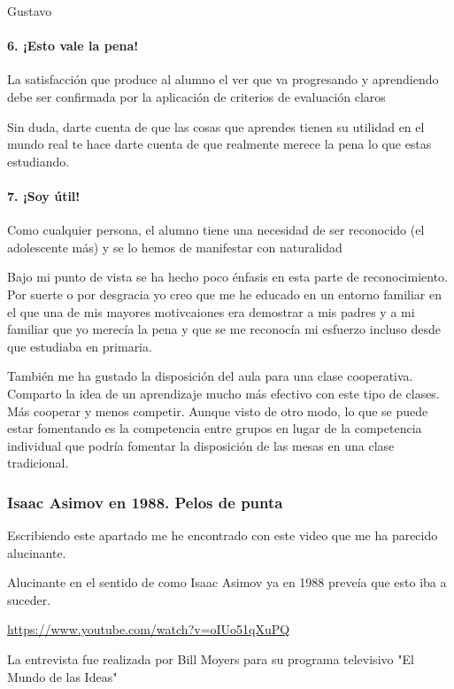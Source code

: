 \begin{opin}{\guscolor}{Gustavo}
\paragraph{6. ¡Esto vale la pena!}

La satisfacción que produce al alumno el ver que va progresando y aprendiendo debe ser confirmada por la aplicación de criterios de evaluación claros

Sin duda, darte cuenta de que las cosas que aprendes tienen su utilidad en el mundo real te hace darte cuenta de que realmente merece la pena lo que estas estudiando.

\paragraph{7. ¡Soy útil!}

Como cualquier persona, el alumno tiene una necesidad de ser reconocido (el adolescente más) y se lo hemos de manifestar con naturalidad

Bajo mi punto de vista se ha hecho poco énfasis en esta parte de reconocimiento. Por suerte o por desgracia yo creo que me he educado en un entorno familiar en el que una de mis mayores motivcaiones era demostrar a mis padres y a mi familiar que yo merecía la pena y que se me reconocía mi esfuerzo incluso desde que estudiaba en primaria. 

También me ha gustado la disposición del aula para una clase cooperativa. Comparto la idea de un aprendizaje mucho más efectivo con este tipo de clases. Más cooperar y menos competir. Aunque visto de otro modo, lo que se puede estar fomentando es la competencia entre grupos en lugar de la competencia individual que podría fomentar la disposición de las mesas en una clase tradicional.


\subsubsection{Isaac Asimov en 1988. Pelos de punta}

Escribiendo este apartado me he encontrado con este video que me ha parecido alucinante.

Alucinante en el sentido de como Isaac Asimov ya en 1988 preveía que esto iba a suceder.

\href{https://www.youtube.com/watch?v=oIUo51qXuPQ}{https://www.youtube.com/watch?v=oIUo51qXuPQ}

La entrevista fue realizada por Bill Moyers para su programa televisivo "El Mundo de las Ideas"


\end{opin}
